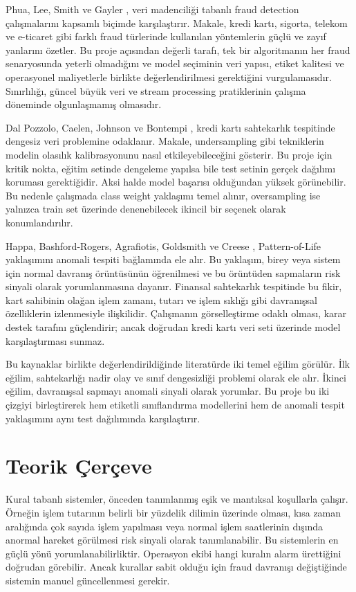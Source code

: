 \documentclass[conference]{IEEEtran}
\begin{document}
Phua, Lee, Smith ve Gayler \cite{phua2010}, veri madenciliği tabanlı fraud detection çalışmalarını kapsamlı biçimde karşılaştırır. Makale, kredi kartı, sigorta, telekom ve e-ticaret gibi farklı fraud türlerinde kullanılan yöntemlerin güçlü ve zayıf yanlarını özetler. Bu proje açısından değerli tarafı, tek bir algoritmanın her fraud senaryosunda yeterli olmadığını ve model seçiminin veri yapısı, etiket kalitesi ve operasyonel maliyetlerle birlikte değerlendirilmesi gerektiğini vurgulamasıdır. Sınırlılığı, güncel büyük veri ve stream processing pratiklerinin çalışma döneminde olgunlaşmamış olmasıdır.

Dal Pozzolo, Caelen, Johnson ve Bontempi \cite{dalpozzolo2015}, kredi kartı sahtekarlık tespitinde dengesiz veri problemine odaklanır. Makale, undersampling gibi tekniklerin modelin olasılık kalibrasyonunu nasıl etkileyebileceğini gösterir. Bu proje için kritik nokta, eğitim setinde dengeleme yapılsa bile test setinin gerçek dağılımı koruması gerektiğidir. Aksi halde model başarısı olduğundan yüksek görünebilir. Bu nedenle çalışmada class weight yaklaşımı temel alınır, oversampling ise yalnızca train set üzerinde denenebilecek ikincil bir seçenek olarak konumlandırılır.

Happa, Bashford-Rogers, Agrafiotis, Goldsmith ve Creese \cite{happa2019}, Pattern-of-Life yaklaşımını anomali tespiti bağlamında ele alır. Bu yaklaşım, birey veya sistem için normal davranış örüntüsünün öğrenilmesi ve bu örüntüden sapmaların risk sinyali olarak yorumlanmasına dayanır. Finansal sahtekarlık tespitinde bu fikir, kart sahibinin olağan işlem zamanı, tutarı ve işlem sıklığı gibi davranışsal özelliklerin izlenmesiyle ilişkilidir. Çalışmanın görselleştirme odaklı olması, karar destek tarafını güçlendirir; ancak doğrudan kredi kartı veri seti üzerinde model karşılaştırması sunmaz.

Bu kaynaklar birlikte değerlendirildiğinde literatürde iki temel eğilim görülür. İlk eğilim, sahtekarlığı nadir olay ve sınıf dengesizliği problemi olarak ele alır. İkinci eğilim, davranışsal sapmayı anomali sinyali olarak yorumlar. Bu proje bu iki çizgiyi birleştirerek hem etiketli sınıflandırma modellerini hem de anomali tespit yaklaşımını aynı test dağılımında karşılaştırır.

\section{Teorik Çerçeve}

Kural tabanlı sistemler, önceden tanımlanmış eşik ve mantıksal koşullarla çalışır. Örneğin işlem tutarının belirli bir yüzdelik dilimin üzerinde olması, kısa zaman aralığında çok sayıda işlem yapılması veya normal işlem saatlerinin dışında anormal hareket görülmesi risk sinyali olarak tanımlanabilir. Bu sistemlerin en güçlü yönü yorumlanabilirliktir. Operasyon ekibi hangi kuralın alarm ürettiğini doğrudan görebilir. Ancak kurallar sabit olduğu için fraud davranışı değiştiğinde sistemin manuel güncellenmesi gerekir.
\end{document}
